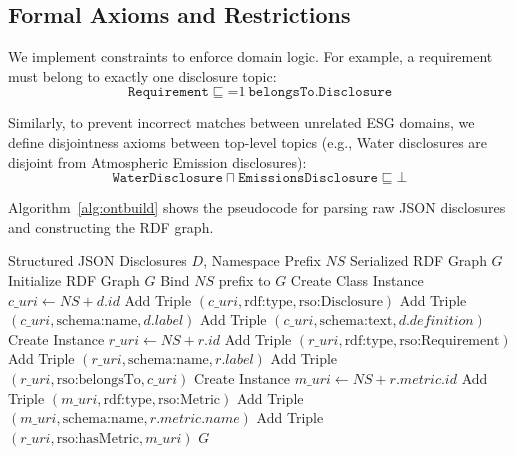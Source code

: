 \documentclass[journal,compsoc]{IEEEtran}
\begin{document}
\begin{itemize}
\begin{table}[t]
\begin{itemize}
\subsection{Formal Axioms and Restrictions}
We implement constraints to enforce domain logic. For example, a requirement must belong to exactly one disclosure topic:
\begin{equation}
\texttt{Requirement} \sqsubseteq \mathord{=} 1\ \texttt{belongsTo}.\texttt{Disclosure}
\end{equation}

Similarly, to prevent incorrect matches between unrelated ESG domains, we define disjointness axioms between top-level topics (e.g., Water disclosures are disjoint from Atmospheric Emission disclosures):
\begin{equation}
\texttt{WaterDisclosure} \sqcap \texttt{EmissionsDisclosure} \sqsubseteq \bot
\end{equation}

Algorithm~\ref{alg:ontbuild} shows the pseudocode for parsing raw JSON disclosures and constructing the RDF graph.

\begin{algorithm}
\caption{Ontology Construction Pipeline}
\label{alg:ontbuild}
\begin{algorithmic}[1]
\REQUIRE Structured JSON Disclosures $D$, Namespace Prefix $NS$
\ENSURE Serialized RDF Graph $G$
\STATE Initialize RDF Graph $G$
\STATE Bind $NS$ prefix to $G$
    \STATE Create Class Instance $c\_uri \leftarrow NS + d.id$
    \STATE Add Triple $(c\_uri, \text{rdf:type}, \text{rso:Disclosure})$
    \STATE Add Triple $(c\_uri, \text{schema:name}, d.label)$
    \STATE Add Triple $(c\_uri, \text{schema:text}, d.definition)$
        \STATE Create Instance $r\_uri \leftarrow NS + r.id$
        \STATE Add Triple $(r\_uri, \text{rdf:type}, \text{rso:Requirement})$
        \STATE Add Triple $(r\_uri, \text{schema:name}, r.label)$
        \STATE Add Triple $(r\_uri, \text{rso:belongsTo}, c\_uri)$
            \STATE Create Instance $m\_uri \leftarrow NS + r.metric.id$
            \STATE Add Triple $(m\_uri, \text{rdf:type}, \text{rso:Metric})$
            \STATE Add Triple $(m\_uri, \text{schema:name}, r.metric.name)$
            \STATE Add Triple $(r\_uri, \text{rso:hasMetric}, m\_uri)$
        \ENDIF
    \ENDFOR
\ENDFOR
\RETURN $G$
\end{algorithmic}
\end{algorithm}


\end{itemize}
\end{table}
\end{itemize}
\end{document}
